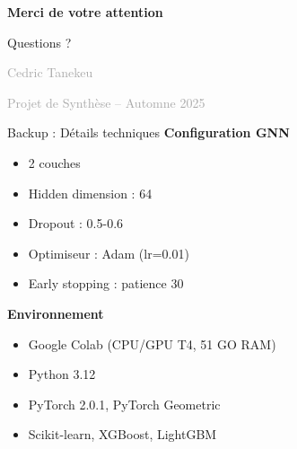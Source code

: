 ﻿\documentclass[aspectratio=169]{beamer}
\begin{document}
\begin{frame}[plain]
\begin{center}
\vspace{2cm}
{\Huge \textcolor{mainblue}{\textbf{Merci de votre attention}}}

\vspace{1cm}

{\Large Questions ?}

\vspace{1.5cm}

\textcolor{darkgray}{Cedric Tanekeu}

\textcolor{darkgray}{Projet de Synthèse -- Automne 2025}
\end{center}
\end{frame}

\appendix

\begin{frame}{Backup : Détails techniques}
\textbf{Configuration GNN}
\begin{itemize}
    \item 2 couches
    \item Hidden dimension : 64
    \item Dropout : 0.5-0.6
    \item Optimiseur : Adam (lr=0.01)
    \item Early stopping : patience 30
\end{itemize}

\vspace{0.3cm}

\textbf{Environnement}
\begin{itemize}
    \item Google Colab (CPU/GPU T4, 51 GO RAM)
    \item Python 3.12
    \item PyTorch 2.0.1, PyTorch Geometric
    \item Scikit-learn, XGBoost, LightGBM
\end{itemize}
\end{frame}
\end{document}
